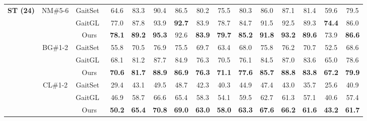 \documentclass[runningheads]{llncs}
\begin{document}
\begin{table}[ht]
{\begin{tabular}{c|c|c|c|c|c|c|c|c|c|c|c|c|c|c}
    \multicolumn{1}{c|}{\multirow{9}[2]{*}{\textbf{ST (24)}}} & \multicolumn{1}{c|}{\multirow{3}[2]{*}{NM\#5-6}} & GaitSet~\cite{aaai2019gaitset} & 64.6  & 83.3  & 90.4  & 86.5  & 80.2  & 75.5  & 80.3  & 86.0  & 87.1  & 81.4  & 59.6  & 79.5   \\
\cline{3-15}          &       & \multicolumn{1}{c|}{GaitGL~\cite{gaitgl}} & 77.0  & 87.8  & 93.9  & \textbf{92.7} & 83.9  & 78.7  & 84.7  & 91.5  & 92.5  & 89.3  & \textbf{74.4} & 86.0   \\
\cline{3-15}          &       & Ours  & \textbf{78.1} & \textbf{89.2} & \textbf{95.3} & 92.6  & \textbf{83.9} & \textbf{79.7} & \textbf{85.2} & \textbf{91.8} & \textbf{93.2} & \textbf{89.6} & 73.9  & \textbf{86.6}  \\
\cline{2-15}          & \multicolumn{1}{c|}{\multirow{3}[2]{*}{BG\#1-2}} & GaitSet~\cite{aaai2019gaitset} & 55.8  & 70.5  & 76.9  & 75.5  & 69.7  & 63.4  & 68.0  & 75.8  & 76.2  & 70.7  & 52.5  & 68.6   \\
\cline{3-15}          &       & \multicolumn{1}{c|}{GaitGL~\cite{gaitgl}} & 68.1  & 81.2  & 87.7  & 84.9  & 76.3  & 70.5  & 76.1  & 84.5  & 87.0  & 83.6  & 65.0  & 78.6   \\
\cline{3-15}          &       & Ours  & \textbf{70.6} & \textbf{81.7} & \textbf{88.9} & \textbf{86.9} & \textbf{76.3} & \textbf{71.1} & \textbf{77.6} & \textbf{85.7} & \textbf{88.8} & \textbf{83.8} & \textbf{67.2} & \textbf{79.9}  \\
\cline{2-15}          & \multicolumn{1}{c|}{\multirow{3}[2]{*}{CL\#1-2}} & GaitSet~\cite{aaai2019gaitset} & 29.4  & 43.1  & 49.5  & 48.7  & 42.3  & 40.3  & 44.9  & 47.4  & 43.0  & 35.7  & 25.6  & 40.9   \\
\cline{3-15}          &       & \multicolumn{1}{c|}{GaitGL~\cite{gaitgl}} & 46.9  & 58.7  & 66.6  & 65.4  & 58.3  & 54.1  & 59.5  & 62.7  & 61.3  & 57.1  & 40.6  & 57.4   \\
\cline{3-15}          &       & Ours  & \textbf{50.2} & \textbf{65.4} & \textbf{70.8} & \textbf{69.0} & \textbf{63.0} & \textbf{58.0} & \textbf{63.3} & \textbf{67.6} & \textbf{66.2} & \textbf{61.6} & \textbf{43.2} & \textbf{61.7}  \\


\end{tabular}}
\end{table}
\end{document}
